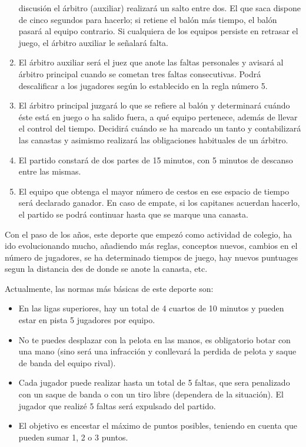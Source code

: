 \documentclass[
]{article}
\providecommand{\tightlist}{%
  \setlength{\itemsep}{0pt}\setlength{\parskip}{0pt}}
\begin{document}
\begin{enumerate}
  discusión el árbitro (auxiliar) realizará un salto entre dos. El que
  saca dispone de cinco segundos para hacerlo; si retiene el balón más
  tiempo, el balón pasará al equipo contrario. Si cualquiera de los
  equipos persiste en retrasar el juego, el árbitro auxiliar le señalará
  falta.
\item
  El árbitro auxiliar será el juez que anote las faltas personales y
  avisará al árbitro principal cuando se cometan tres faltas
  consecutivas. Podrá descalificar a los jugadores según lo establecido
  en la regla número 5.
\item
  El árbitro principal juzgará lo que se refiere al balón y determinará
  cuándo éste está en juego o ha salido fuera, a qué equipo pertenece,
  además de llevar el control del tiempo. Decidirá cuándo se ha marcado
  un tanto y contabilizará las canastas y asimismo realizará las
  obligaciones habituales de un árbitro.
\item
  El partido constará de dos partes de 15 minutos, con 5 minutos de
  descanso entre las mismas.
\item
  El equipo que obtenga el mayor número de cestos en ese espacio de
  tiempo será declarado ganador. En caso de empate, si los capitanes
  acuerdan hacerlo, el partido se podrá continuar hasta que se marque
  una canasta.
\end{enumerate}

Con el paso de los años, este deporte que empezó como actividad de
colegio, ha ido evolucionando mucho, añadiendo más reglas, conceptos
nuevos, cambios en el número de jugadores, se ha determinado tiempos de
juego, hay nuevos puntuages segun la distancia des de donde se anote la
canasta, etc.

Actualmente, las normas más básicas de este deporte son:

\begin{itemize}
\tightlist
\item
  En las ligas superiores, hay un total de 4 cuartos de 10 minutos y
  pueden estar en pista 5 jugadores por equipo.
\item
  No te puedes desplazar con la pelota en las manos, es obligatorio
  botar con una mano (sino será una infracción y conllevará la perdida
  de pelota y saque de banda del equipo rival).
\item
  Cada jugador puede realizar hasta un total de 5 faltas, que sera
  penalizado con un saque de banda o con un tiro libre (dependera de la
  situación). El jugador que realizé 5 faltas será expulsado del
  partido.
\item
  El objetivo es encestar el máximo de puntos posibles, teniendo en
  cuenta que pueden sumar 1, 2 o 3 puntos.
\end{itemize}
\end{document}
